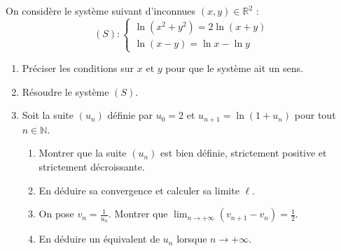 \documentclass[11pt]{article}
\begin{document}
\begin{exercice}
On considère le système suivant d'inconnues $(x,y) \in \mathbb{R}^2$ :
\[
(S) : \begin{cases}
\ln(x^2 + y^2) = 2\ln(x+y) \\
\ln(x-y) = \ln x - \ln y
\end{cases}
\]
\begin{enumerate}
    \item Préciser les conditions sur $x$ et $y$ pour que le système ait un sens.
    \item Résoudre le système $(S)$.
    \item Soit la suite $(u_n)$ définie par $u_0 = 2$ et $u_{n+1} = \ln(1+u_n)$ pour tout $n \in \mathbb{N}$.
    \begin{enumerate}
        \item Montrer que la suite $(u_n)$ est bien définie, strictement positive et strictement décroissante.
        \item En déduire sa convergence et calculer sa limite $\ell$.
        \item On pose $v_n = \frac{1}{u_n}$. Montrer que $\lim_{n\to+\infty} (v_{n+1} - v_n) = \frac{1}{2}$.
        \item En déduire un équivalent de $u_n$ lorsque $n \to +\infty$.
    \end{enumerate}
\end{enumerate}
\end{exercice}
\end{document}
